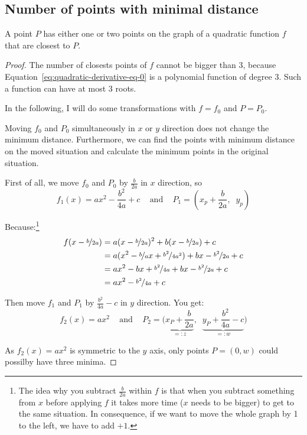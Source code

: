 \subsection{Number of points with minimal distance}
\begin{theorem}
    A point $P$ has either one or two points on the graph of a 
    quadratic function $f$ that are closest to $P$.
\end{theorem}

\begin{proof}
The number of closests points of $f$ cannot be bigger than 3, because
Equation~\ref{eq:quadratic-derivative-eq-0} is a polynomial function
of degree 3. Such a function can have at most 3 roots.

In the following, I will do some transformations with $f = f_0$ and
$P = P_0$.

Moving $f_0$ and $P_0$ simultaneously in $x$ or $y$ direction does 
not change the minimum distance. Furthermore, we can find the 
points with minimum distance on the moved situation and calculate
the minimum points in the original situation.

First of all, we move $f_0$ and $P_0$ by $\frac{b}{2a}$ in $x$ direction, so
\[f_1(x) = ax^2 - \frac{b^2}{4a} + c \;\;\;\text{ and }\;\;\; P_1 = \left (x_p+\frac{b}{2a},\;\; y_p \right )\]

Because:\footnote{The idea why you subtract $\frac{b}{2a}$ within
$f$ is that when you subtract something from $x$ before applying
$f$ it takes more time ($x$ needs to be bigger) to get to the same
situation. In consequence, if we want to move the whole graph by 1 
to the left, we have to add $+1$.}
\begin{align}
    f(x-\nicefrac{b}{2a}) &= a (x-\nicefrac{b}{2a})^2 + b (x-\nicefrac{b}{2a}) + c\\
    &= a (x^2 - \nicefrac{b}{a} x + \nicefrac{b^2}{4a^2}) + bx - \nicefrac{b^2}{2a} + c\\
    &= ax^2 - bx + \nicefrac{b^2}{4a} + bx - \nicefrac{b^2}{2a} + c\\
    &= ax^2 -\nicefrac{b^2}{4a} + c
\end{align}


Then move $f_1$ and $P_1$ by $\frac{b^2}{4a}-c$ in $y$ direction. You get:
\[f_2(x) = ax^2\;\;\;\text{ and }\;\;\; P_2 = \Big (\underbrace{x_P+\frac{b}{2a}}_{=: z},\;\; \underbrace{y_P+\frac{b^2}{4a}-c}_{=: w} \Big )\]

As $f_2(x) = ax^2$ is symmetric to the $y$ axis, only points 
$P = (0, w)$ could possilby have three minima.


\end{proof}
